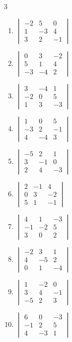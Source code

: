 \begin{multicols}{3}
\begin{enumerate}[label=\arabic*.,  leftmargin=*]
\item $\begin{vmatrix} -2 & 5 & 0 \\ 1 & -3 & 4 \\ 3 & 2 & -1 \end{vmatrix}$
\item $\begin{vmatrix} 0 & 3 & -2 \\ 5 & 1 & 4 \\ -3 & -4 & 2 \end{vmatrix}$
\item $\begin{vmatrix} 3 & -4 & 1 \\ -2 & 0 & 5 \\ 1 & 3 & -3 \end{vmatrix}$
\item $\begin{vmatrix} 1 & 0 & 5 \\ -3 & 2 & -1 \\ 4 & -4 & 3 \end{vmatrix}$
\item $\begin{vmatrix} -5 & 2 & 1 \\ 3 & -1 & 0 \\ 2 & 4 & -3 \end{vmatrix}$
\item $\begin{vmatrix} 2 & -1 & 4 \\ 0 & 3 & -2 \\ 5 & 1 & -1 \end{vmatrix}$
\item $\begin{vmatrix} 4 & 1 & -3 \\ -1 & -2 & 5 \\ 3 & 0 & 2 \end{vmatrix}$
\item $\begin{vmatrix} -2 & 3 & 1 \\ 4 & -5 & 2 \\ 0 & 1 & -4 \end{vmatrix}$
\item $\begin{vmatrix} 1 & -2 & 0 \\ 3 & 4 & -1 \\ -5 & 2 & 3 \end{vmatrix}$
\item $\begin{vmatrix} 6 & 0 & -3 \\ -1 & 2 & 5 \\ 4 & -3 & 1 \end{vmatrix}$

\end{enumerate}
\end{multicols}
